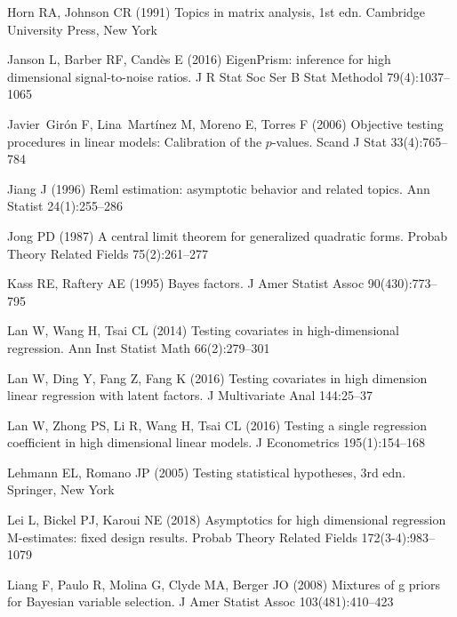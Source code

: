 \documentclass[smallextended]{svjour3}       %
\begin{document}
\begin{thebibliography}{}
Horn RA, Johnson CR (1991) Topics in matrix analysis, 1st edn. Cambridge
  University Press, New York

Janson L, Barber RF, Cand{\`{e}}s E (2016) {EigenPrism}: inference for high
  dimensional signal-to-noise ratios. J R Stat Soc Ser B Stat Methodol 79(4):1037--1065

Javier~Gir\'on F, Lina~Mart\'inez M, Moreno E, Torres F (2006) Objective
  testing procedures in linear models: Calibration of the $p$-values.
  Scand J Stat 33(4):765--784

Jiang J (1996) Reml estimation: asymptotic behavior and related topics. Ann Statist 24(1):255--286

Jong PD (1987) A central limit theorem for generalized quadratic forms.
  Probab Theory Related Fields 75(2):261--277

Kass RE, Raftery AE (1995) Bayes factors. J Amer Statist Assoc 90(430):773--795

Lan W, Wang H, Tsai CL (2014) Testing covariates in high-dimensional
  regression. Ann Inst Statist Math 66(2):279--301

Lan W, Ding Y, Fang Z, Fang K (2016{}) Testing covariates in high
  dimension linear regression with latent factors. J Multivariate
  Anal 144:25--37

Lan W, Zhong PS, Li R, Wang H, Tsai CL (2016{}) Testing a single
  regression coefficient in high dimensional linear models. J Econometrics 195(1):154--168

Lehmann EL, Romano JP (2005) Testing statistical hypotheses, 3rd edn. Springer,
  New York

Lei L, Bickel PJ, Karoui NE (2018) Asymptotics for high dimensional regression
  M-estimates: fixed design results. Probab Theory Related Fields 172(3-4):983--1079

Liang F, Paulo R, Molina G, Clyde MA, Berger JO (2008) Mixtures of g priors for
  Bayesian variable selection. J Amer Statist Assoc 103(481):410--423


\end{thebibliography}
\end{document}
